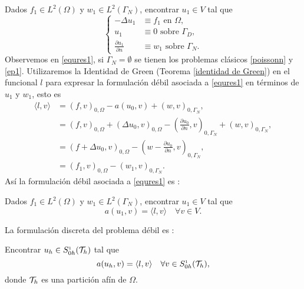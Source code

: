 Dados $f_{1}\in L^{2}(\Omega)$ y $w_{1}\in L^{2}(\Gamma_{N})$, encontrar $u_{1}\in V$ tal que 
\begin{equation}\label{equres1} 
\left\{
\begin{aligned}
-\Delta u_{1} &\equiv f_{1} \text{ en  } \Omega,\\
u_{1}&\equiv 0 \text{ sobre } \Gamma_{D},\\
\frac{\partial u_{1} }{\partial n}& \equiv w_{1} \text{ sobre } \Gamma_{N}. 
\end{aligned}
\right.
\end{equation}
Observemos en \eqref{equres1}, si $\Gamma_{N}=\emptyset$ se tienen los problemas cl\'asicos \eqref{poissonn} y \eqref{ep1}. Utilizaremos la Identidad de Green (Teorema \eqref{identidad de Green}) en el funcional $l$ para expresar la formulaci\'on d\'ebil asociada a \eqref{equres1} en t\'erminos  de $u_{1}$ y $w_{1}$, esto es 
\begin{equation*}
\begin{split}
\langle l,v \rangle &= (f,v)_{0,\Omega} - a(u_{0},v) + (w,v)_{0,\Gamma_{N}},\\
&=(f,v)_{0,\Omega} + \left(\Delta u_{0},v\right)_{0,\Omega} - \left(\frac{\partial u_{0}}{\partial n},v\right)_{0,\Gamma_{N}} + (w,v)_{0,\Gamma_{N}},\\
&=(f+\Delta u_{0},v)_{0,\Omega} - \left( w-\frac{\partial u_{0}}{\partial n},v \right)_{0,\Gamma_{N}}, \\
&=(f_{1},v)_{0,\Omega} - (w_{1},v)_{0,\Gamma_{N}}.
\end{split}
\end{equation*}
As\'i la formulaci\'on d\'ebil asociada a \eqref{equres1} es : 

Dados $f_{1}\in L^{2}(\Omega)$ y $w_{1}\in L^{2}(\Gamma_{N})$, encontrar $u_{1}\in V$ tal que 
\begin{equation}\label{problemaresidualdebil}
a(u_{1},v)=\langle l,v \rangle \quad  \forall v\in V.
\end{equation}

La formulaci\'on discreta del problema d\'ebil es :

Encontrar $u_{h}\in S^{\text{\tiny 1}}_{0h}({\mathcal{T}}_{h})$ tal que 
\begin{equation}\label{problemaresidualdiscreto}
a(u_{h},v)=\langle l,v \rangle \quad \forall v\in S^{\text{\tiny 1}}_{0h}({\mathcal{T}}_{h}),
\end{equation}
donde ${\mathcal{T}}_{h}$ es una partici\'on af\'in de $\Omega$.
